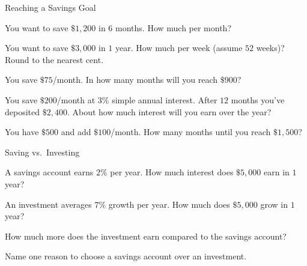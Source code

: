 \begin{practiceBox}[funTeal]{Reaching a Savings Goal}

\prob You want to save $\$1{,}200$ in $6$ months. How much per month? \answerBlank[3cm]

\prob You want to save $\$3{,}000$ in $1$ year. How much per week (assume $52$ weeks)? Round to the nearest cent. \answerBlank[3cm]

\prob You save $\$75$/month. In how many months will you reach $\$900$? \answerBlank[3cm]

\prob You save $\$200$/month at $3\%$ simple annual interest. After $12$ months you've deposited $\$2{,}400$. About how much interest will you earn over the year? \answerBlank[3cm]

\prob You have $\$500$ and add $\$100$/month. How many months until you reach $\$1{,}500$? \answerBlank[3cm]
\end{practiceBox}

\begin{practiceBox}[funOrange]{Saving vs.\ Investing}

\prob A savings account earns $2\%$ per year. How much interest does $\$5{,}000$ earn in $1$ year? \answerBlank[3cm]

\prob An investment averages $7\%$ growth per year. How much does $\$5{,}000$ grow in $1$ year? \answerBlank[3cm]

\prob How much more does the investment earn compared to the savings account? \answerBlank[3cm]

\prob Name one reason to choose a savings account over an investment. \answerBlank[5cm]
\end{practiceBox}

